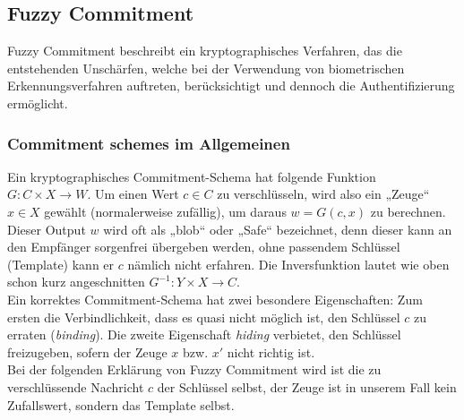 \documentclass[12pt,a4paper]{article}
\begin{document}
\cite{biometrictemplate_intro}
\subsection{Fuzzy Commitment}
Fuzzy Commitment beschreibt ein kryptographisches Verfahren, das die entstehenden Unschärfen, welche bei der Verwendung von biometrischen Erkennungsverfahren auftreten, berücksichtigt und dennoch die Authentifizierung ermöglicht.
\subsubsection{Commitment schemes im Allgemeinen} 
Ein kryptographisches Commitment-Schema hat folgende Funktion $G : C\times X \rightarrow W$. Um einen Wert $c\in C$ zu verschlüsseln, wird also ein „Zeuge“ $x\in X$ gewählt (normalerweise zufällig), um daraus $w = G(c,x)$ zu berechnen. Dieser Output $w$ wird oft als „blob“ oder „Safe“ bezeichnet, denn dieser kann an den Empfänger sorgenfrei übergeben werden, ohne passendem Schlüssel (Template) kann er $c$ nämlich nicht erfahren. Die Inversfunktion lautet wie oben schon kurz angeschnitten $G^{-1} : Y\times X \rightarrow C$. \\
Ein korrektes Commitment-Schema hat zwei besondere Eigenschaften: Zum ersten die Verbindlichkeit, dass es quasi nicht möglich ist, den Schlüssel $c$ zu erraten (\textit{binding}). Die zweite Eigenschaft \textit{hiding} verbietet, den Schlüssel freizugeben, sofern der Zeuge $x$ bzw. $x'$ nicht richtig ist. \\
Bei der folgenden Erklärung von Fuzzy Commitment wird ist die zu verschlüssende Nachricht $c$ der Schlüssel selbst, der Zeuge ist in unserem Fall kein Zufallswert, sondern das Template selbst.
\end{document}
